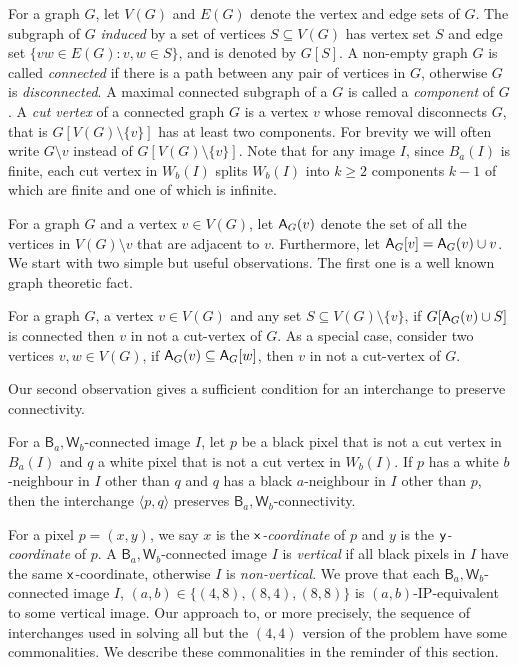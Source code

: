 \documentclass[lotsofwhite,charterfonts]{patmorin}
\newcommand{\x}{\ensuremath{\protect\textup{\textsf{x}}}}
\newcommand{\y}{\ensuremath{\protect\textup{\textsf{y}}}}
\newcommand{\ic}[2]{\langle #1,#2 \rangle}
\newcommand{\A}[2]{\ensuremath{\protect\textup{\textsf{A}}_{#2}(#1)}}
\newcommand{\AC}[2]{\ensuremath{\protect\textup{\textsf{A}}_{#2}[#1]}}
\newcommand{\sm}{\ensuremath{\setminus}}
\newcommand{\se}{\ensuremath{\subseteq}}
\begin{document}
For a graph $G$, let $V(G)$ and $E(G)$ denote the vertex and edge sets
of $G$. The subgraph of $G$ \emph{induced} by a set of vertices $S\se
V(G)$ has vertex set $S$ and edge set $\{vw\in E(G):v, w\in S\}$, and
is denoted by $G[S]$.  A non-empty graph $G$ is called
\emph{connected} if there is a path between any pair of vertices in
$G$, otherwise $G$ is \emph{disconnected}. A maximal connected
subgraph of a $G$ is called a \emph{component} of $G$. A \emph{cut
vertex} of a connected graph $G$ is a vertex $v$ whose removal
disconnects $G$, that is  $G[V(G)\sm \{v\}]$ has at least two components.
For brevity we will often write $G\sm v$ instead of $G[V(G)\sm \{v\}]$.
Note that for any image $I$, since $B_a(I)$ is finite, each cut vertex
in $W_b(I)$ splits $W_b(I)$ into $k\geq 2$ components  $k-1$ of which
are finite and one of which is infinite. 

For a graph $G$ and a vertex $v\in V(G)$, let \A{v}{G} denote the set
of all the vertices in $V(G)\sm v$ that are adjacent to $v$.
Furthermore, let  $\AC{v}{G}=\A{v}{G}\cup v$. We start with two simple
but useful observations. The first one is a well known graph theoretic
fact. 

\begin{obs}
For a graph $G$, a vertex $v\in V(G)$ and any set $S\se V(G)\sm
\{v\}$, if $G[\A{v}{G}\cup S]$ is connected then $v$ in not a
cut-vertex of $G$.  As a special case,  consider two vertices $v, w\in
V(G)$, if $\A{v}{G}\se \AC{w}{G}$, then $v$ in not a cut-vertex of
$G$.
\end{obs}

Our second observation gives a sufficient condition for an interchange
to preserve connectivity.

\begin{obs} 
For a $\textsf{B}_a,\textsf{W}_b$-connected image $I$, let $p$ be a
black pixel that is not a cut vertex in $B_a(I)$ and $q$ a white pixel
that is not a cut vertex in $W_b(I)$. If $p$ has a white $b$-neighbour
in $I$ other than $q$ and $q$ has a black $a$-neighbour in $I$ other
than $p$, then the interchange $\ic{p}{q}$ preserves
$\textsf{B}_a,\textsf{W}_b$-connectivity.  
\end{obs}


For a pixel $p=(x,y)$, we say $x$ is the \emph{\x-coordinate} of $p$
and $y$ is the \emph{\y-coordinate} of $p$. A
$\textsf{B}_a,\textsf{W}_b$-connected image $I$ is \emph{vertical} if
all black pixels in $I$ have the same \x-coordinate, otherwise $I$ is
\emph{non-vertical}. We prove that each
$\textsf{B}_a,\textsf{W}_b$-connected image $I$, $(a,b)\in \{(4,8),
(8,4), (8,8)\}$ is $(a,b)$-IP-equivalent to some vertical image. Our
approach to, or more precisely, the sequence of interchanges used in
solving  all but the $(4,4)$ version of the problem have some
commonalities.  We describe these commonalities in the reminder of
this section. 
\end{document}
